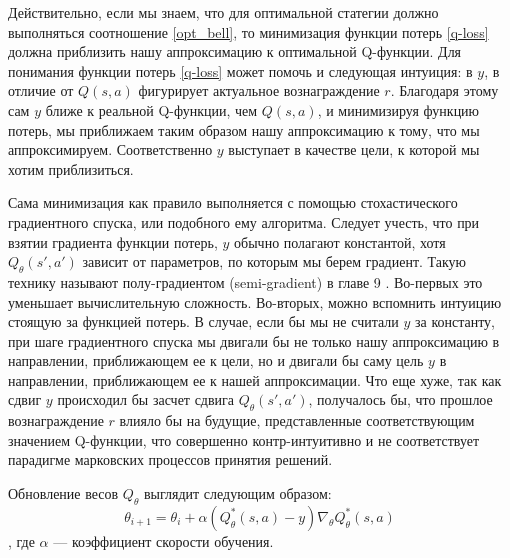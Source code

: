 \documentclass[12pt, a4paper]{extarticle}
\theoremstyle{definition}
\begin{document}
Действительно, если мы знаем, что для оптимальной статегии должно выполняться соотношение \ref{opt_bell}, то минимизация функции потерь \ref{q-loss} должна приблизить нашу аппроксимацию к оптимальной Q-функции.
Для понимания функции потерь \ref{q-loss} может помочь и следующая интуиция: в $y$, в отличие от $Q(s,a)$ фигурирует актуальное вознаграждение $r$. Благодаря этому сам $y$ ближе к реальной Q-функции, чем $Q(s,a)$, и минимизируя функцию потерь, мы приближаем таким образом нашу аппроксимацию к тому, что мы аппроксимируем. Соответственно $y$ выступает в качестве цели, к которой мы хотим приблизиться. 

Сама минимизация как правило выполняется с помощью стохастического градиентного спуска, или подобного ему алгоритма. Следует учесть, что при взятии градиента функции потерь, $y$ обычно полагают константой, хотя $Q_{\theta}(s',a')$ зависит от параметров, по которым мы берем градиент. Такую технику называют полу-градиентом (semi-gradient) в главе 9 \cite{Sutton1998}. Во-первых это уменьшает вычислительную сложность. Во-вторых, можно вспомнить интуицию стоящую за функцией потерь. В случае, если бы мы не считали $y$ за константу, при шаге градиентного спуска мы двигали бы не только нашу аппроксимацию в направлении, приближающем ее к цели, но и двигали бы саму цель $y$ в направлении, приближающем ее к нашей аппроксимации. Что еще хуже, так как сдвиг $y$ происходил бы засчет сдвига $Q_{\theta}(s',a')$, получалось бы, что прошлое вознаграждение $r$ влияло бы на будущие, представленные соответствующим значением Q-функции, что совершенно контр-интуитивно и не соответствует парадигме марковских процессов принятия решений.

Обновление весов $Q_{\theta}$ выглядит следующим образом:
\begin{equation} \label{q-update}
    \theta_{i+1} = \theta_i + \alpha (Q_{\theta}^{*}(s,a) - y)\nabla_{\theta}Q_{\theta}^{*}(s,a)
\end{equation},
где $\alpha$ --- коэффициент скорости обучения.
\end{document}
